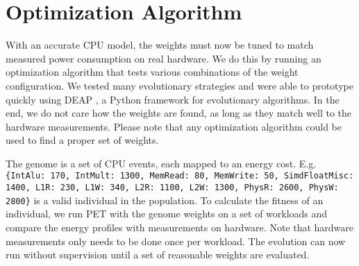 \section{Optimization Algorithm}

With an accurate CPU model, the weights must now be tuned to match measured
power consumption on real hardware. We do this by running an optimization
algorithm that tests various combinations of the weight configuration. We tested
many evolutionary strategies and were able to prototype quickly using DEAP
\cite{DEAP_JMLR2012}, a Python framework for evolutionary algorithms. In the
end, we do not care how the weights are found, as long as they match well to the
hardware measurements. Please note that any optimization algorithm could be used
to find a proper set of weights.

The genome is a set of CPU events, each mapped to an energy cost. E.g.
\texttt{\{IntAlu: 170, IntMult: 1300, MemRead: 80, MemWrite: 50, SimdFloatMisc:
1400, L1R: 230, L1W: 340, L2R: 1100, L2W: 1300, PhysR: 2600, PhysW: 2800\}} is a
valid individual in the population. To calculate the fitness of an individual,
we run PET with the genome weights on a set of workloads and compare the energy
profiles with measurements on hardware. Note that hardware measurements only
needs to be done once per workload. The evolution can now run without
supervision until a set of reasonable weights are evaluated.
